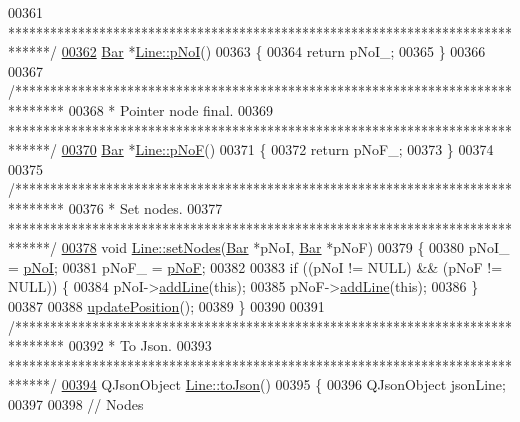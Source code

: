 \begin{DoxyCode}
00361 \textcolor{comment}{ ******************************************************************************/}
\hypertarget{line_8cpp_source_l00362}{}\hyperlink{group___models_gaeafd90e84ac2f8de2a879abe9e53eef3}{00362} \hyperlink{class_bar}{Bar} *\hyperlink{group___models_gaeafd90e84ac2f8de2a879abe9e53eef3}{Line::pNoI}()
00363 \{
00364   \textcolor{keywordflow}{return} pNoI\_;
00365 \}
00366 
00367 \textcolor{comment}{/*******************************************************************************}
00368 \textcolor{comment}{ * Pointer node final.}
00369 \textcolor{comment}{ ******************************************************************************/}
\hypertarget{line_8cpp_source_l00370}{}\hyperlink{group___models_gabbc73ddedd3075c33ae5331bd7c9829f}{00370} \hyperlink{class_bar}{Bar} *\hyperlink{group___models_gabbc73ddedd3075c33ae5331bd7c9829f}{Line::pNoF}()
00371 \{
00372   \textcolor{keywordflow}{return} pNoF\_;
00373 \}
00374 
00375 \textcolor{comment}{/*******************************************************************************}
00376 \textcolor{comment}{ * Set nodes.}
00377 \textcolor{comment}{ ******************************************************************************/}
\hypertarget{line_8cpp_source_l00378}{}\hyperlink{group___models_gaeeab146e6c1d7d1a688a2764a9c9a170}{00378} \textcolor{keywordtype}{void} \hyperlink{group___models_gaeeab146e6c1d7d1a688a2764a9c9a170}{Line::setNodes}(\hyperlink{class_bar}{Bar} *pNoI, \hyperlink{class_bar}{Bar} *pNoF)
00379 \{
00380   pNoI\_ = \hyperlink{group___models_gaeafd90e84ac2f8de2a879abe9e53eef3}{pNoI};
00381   pNoF\_ = \hyperlink{group___models_gabbc73ddedd3075c33ae5331bd7c9829f}{pNoF};
00382 
00383   \textcolor{keywordflow}{if} ((pNoI != NULL) && (pNoF != NULL)) \{
00384     pNoI->\hyperlink{group___models_gabb1a3b7653d4e2327c4bf728210f197e}{addLine}(\textcolor{keyword}{this});
00385     pNoF->\hyperlink{group___models_gabb1a3b7653d4e2327c4bf728210f197e}{addLine}(\textcolor{keyword}{this});
00386   \}
00387 
00388   \hyperlink{group___models_ga8fdb12651d4bc592616d241386b066b3}{updatePosition}();
00389 \}
00390 
00391 \textcolor{comment}{/*******************************************************************************}
00392 \textcolor{comment}{ * To Json.}
00393 \textcolor{comment}{ ******************************************************************************/}
\hypertarget{line_8cpp_source_l00394}{}\hyperlink{group___models_ga4effa7a96db465ea6e01135d5a010739}{00394} QJsonObject \hyperlink{group___models_ga4effa7a96db465ea6e01135d5a010739}{Line::toJson}()
00395 \{
00396   QJsonObject jsonLine;
00397 
00398   \textcolor{comment}{// Nodes}

\end{DoxyCode}

